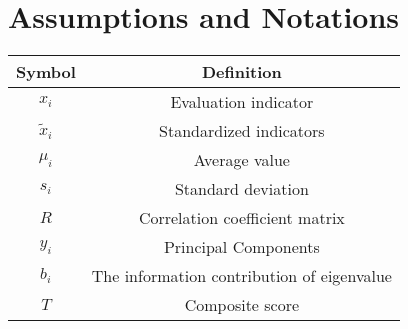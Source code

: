 \section{Assumptions and Notations}
\begin{table}[h]
	\begin{center}
		\begin{tabular}{cc}
			\toprule[1.5pt]
			Symbol&Definition\\
			\midrule[1pt]
			\(x_i\)&Evaluation indicator\\
			\({\tilde x_i}\)&Standardized indicators\\
			\({\mu _i}\)&Average value\\
			\(s_i\)&Standard deviation\\
			\({R}\)&Correlation coefficient matrix\\
			\(y_i\)&Principal Components\\
			\(b_i\)&The information contribution of eigenvalue\\
			\(T\)&Composite score\\
			\bottomrule[1.5pt]
		\end{tabular}
	\end{center}
\end{table}